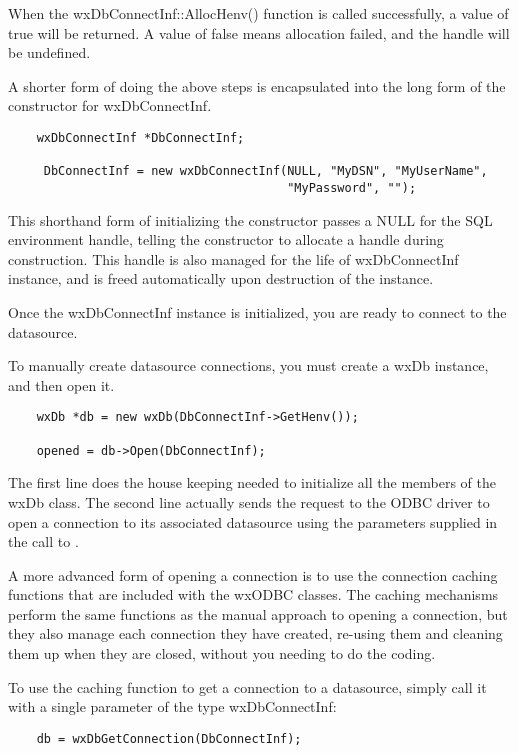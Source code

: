 When the wxDbConnectInf::AllocHenv() function is called successfully, a 
value of true will be returned. A value of false means allocation failed, 
and the handle will be undefined.

A shorter form of doing the above steps is encapsulated into the 
long form of the constructor for wxDbConnectInf.

\begin{verbatim}
    wxDbConnectInf *DbConnectInf;

	 DbConnectInf = new wxDbConnectInf(NULL, "MyDSN", "MyUserName",
	                                   "MyPassword", "");
\end{verbatim}

This shorthand form of initializing the constructor passes a NULL for the SQL 
environment handle, telling the constructor to allocate a handle during 
construction. This handle is also managed for the life of wxDbConnectInf 
instance, and is freed automatically upon destruction of the instance.

Once the wxDbConnectInf instance is initialized, you are ready to 
connect to the datasource.

To manually create datasource connections, you must create a wxDb 
instance, and then open it.

\begin{verbatim}
    wxDb *db = new wxDb(DbConnectInf->GetHenv());

    opened = db->Open(DbConnectInf);
\end{verbatim}

The first line does the house keeping needed to initialize all 
the members of the wxDb class. The second line actually sends the request 
to the ODBC driver to open a connection to its associated datasource using 
the parameters supplied in the call to .

A more advanced form of opening a connection is to use the connection 
caching functions that are included with the wxODBC classes. The caching 
mechanisms perform the same functions as the manual approach to opening a 
connection, but they also manage each connection they have created, 
re-using them and cleaning them up when they are closed, without you 
needing to do the coding.

To use the caching function  to get 
a connection to a datasource, simply call it with a single parameter of the 
type wxDbConnectInf:

\begin{verbatim}
    db = wxDbGetConnection(DbConnectInf);
\end{verbatim}

